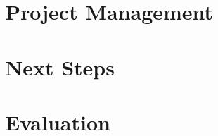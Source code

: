 \documentclass[10pt,a4paper]{article}
\theoremstyle{plain}
\theoremstyle{definition}
\begin{document}

\section{Project Management}


\section{Next Steps}


\section{Evaluation}

\label{sec:evaluation}




\begin{appendices}

%
%    
%    

\end{appendices}
\end{document}
